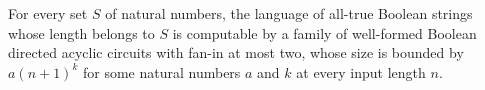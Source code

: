 \begin{theorem}
\label{Language.unary_inPPoly}
\leanok
{}
For every set $S$ of natural numbers, the language of all-true Boolean strings whose
length belongs to $S$ is computable by a family of well-formed Boolean directed acyclic
circuits with fan-in at most two, whose size is bounded by $a(n+1)^k$ for some natural
numbers $a$ and $k$ at every input length $n$.
\end{theorem}
